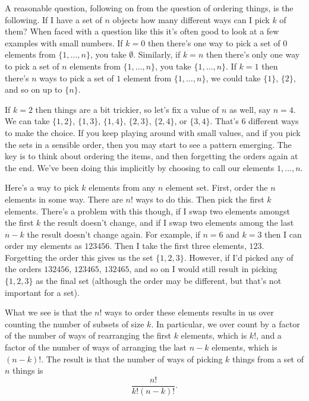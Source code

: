 \documentclass[fleqn]{LectureClass/LectureClass}
\begin{document}
     A reasonable question, following on from the question of ordering things, is the following.
     If I have a set of \(n\) objects how many different ways can I pick \(k\) of them?
     When faced with a question like this it's often good to look at a few examples with small numbers.
     If \(k = 0\) then there's one way to pick a set of \(0\) elements from \(\{1, \dotsc, n\}\), you take \(\emptyset\).
     Similarly, if \(k = n\) then there's only one way to pick a set of \(n\) elements from \(\{1, \dotsc, n\}\), you take \(\{1, \dotsc, n\}\).
     If \(k = 1\) then there's \(n\) ways to pick a set of \(1\) element from \(\{1, \dotsc, n\}\), we could take \(\{1\}\), \(\{2\}\), and so on up to \(\{n\}\).
     
     If \(k = 2\) then things are a bit trickier, so let's fix a value of \(n\) as well, say \(n = 4\).
     We can take \(\{1, 2\}\), \(\{1, 3\}\), \(\{1, 4\}\), \(\{2, 3\}\), \(\{2, 4\}\), or \(\{3, 4\}\).
     That's \(6\) different ways to make the choice.
     If you keep playing around with small values, and if you pick the sets in a sensible order, then you may start to see a pattern emerging.
     The key is to think about ordering the items, and then forgetting the orders again at the end.
     We've been doing this implicitly by choosing to call our elements \(1, \dotsc, n\).
     
     Here's a way to pick \(k\) elements from any \(n\) element set.
     First, order the \(n\) elements in some way.
     There are \(n!\) ways to do this.
     Then pick the first \(k\) elements.
     There's a problem with this though, if I swap two elements amongst the first \(k\) the result doesn't change, and if I swap two elements among the last \(n - k\) the result doesn't change again.
     For example, if \(n = 6\) and \(k = 3\) then I can order my elements as \(123456\).
     Then I take the first three elements, \(123\).
     Forgetting the order this gives us the set \(\{1, 2, 3\}\).
     However, if I'd picked any of the orders \(132456\), \(123465\), \(132465\), and so on I would still result in picking \(\{1, 2, 3\}\) as the final set (although the order may be different, but that's not important for a set).
     
     What we see is that the \(n!\) ways to order these elements results in us over counting the number of subsets of size \(k\).
     In particular, we over count by a factor of the number of ways of rearranging the first \(k\) elements, which is \(k!\), and a factor of the number of ways of arranging the last \(n - k\) elements, which is \((n - k)!\).
     The result is that the number of ways of picking \(k\) things from a set of \(n\) things is
     \begin{equation}
         \frac{n!}{k!(n - k)!}.
     \end{equation}
     
\end{document}

